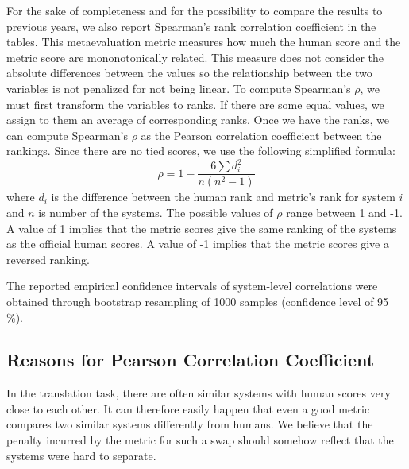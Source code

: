 For the sake of completeness and for the possibility to compare the results to
previous years, we also report Spearman's rank correlation coefficient in the
tables. This metaevaluation metric measures how much the human score and the
metric score are mononotonically related.  This measure does not consider the
absolute differences between the values so the relationship between the two
variables is not penalized for not being linear.  To compute Spearman's $\rho$,
we must first transform the variables to ranks.  If there are some equal
values, we assign to them an average of corresponding ranks. Once we have the
ranks, we can compute Spearman's $\rho$ as the Pearson correlation coefficient
between the rankings. Since there are no tied scores, we use the following
simplified formula: \begin{equation*} \rho = 1 - \frac{6 \sum{d_i^2}}{n(n^2
-1)} \end{equation*} where $d_i$ is the difference between the human rank and
metric's rank for system $i$ and $n$ is number of the systems. The possible
values of $\rho$ range between 1 and -1. A value of 1 implies that the metric
scores give the same ranking of the systems as the official human scores. A
value of -1 implies that the metric scores give a reversed ranking.

The reported empirical confidence intervals of system-level correlations were
obtained through bootstrap resampling of 1000 samples (confidence level of
95\,\%).

\subsection{Reasons for Pearson Correlation Coefficient}




In the translation task, there are often similar systems with human scores very
close to each other. It can therefore easily happen that even a good metric
compares two similar systems differently from humans. We believe that the
penalty incurred by the metric for such a swap should somehow reflect that the
systems were hard to separate.

